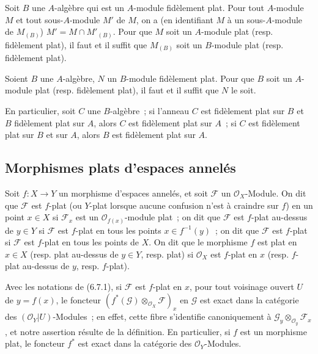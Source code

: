 \begin{env}[6.6.3]
\label{0.6.6.3-fr}
Soit $B$ une $A$-algèbre qui est un $A$-module fidèlement plat. Pour tout
$A$-module $M$ et tout sous-$A$-module $M'$ de $M$, on a (en identifiant $M$
à un sous-$A$-module de $M_{(B)}$) $M'=M\cap M'_{(B)}$. Pour que $M$ soit un
$A$-module plat (resp. fidèlement plat), il faut et il suffit que $M_{(B)}$
soit un $B$-module plat (resp. fidèlement plat).
\end{env}

\begin{env}[6.6.4]
\label{0.6.6.4-fr}
Soient $B$ une $A$-algèbre, $N$ un $B$-module fidèlement plat. Pour que $B$
soit un $A$-module plat (resp. fidèlement plat), il faut et il suffit que $N$
le soit.

En particulier, soit $C$ une $B$-algèbre~; si l'anneau $C$ est fidèlement
plat sur $B$ et $B$ fidèlement plat sur $A$, alors $C$ est fidèlement plat
sur $A$~; si $C$ est fidèlement plat sur $B$ et sur $A$, alors $B$ est
fidèlement plat sur $A$.
\end{env}

\subsection{Morphismes plats d'espaces annelés}
\label{subsection:0.6.7-fr}

\begin{env}[6.7.1]
\label{0.6.7.1-fr}
Soit $f:X\to Y$ un morphisme d'espaces annelés, et soit $\mathcal F$ un
$\mathcal O_X$-Module. On dit que $\mathcal F$ est $f$-plat (ou $Y$-plat
lorsque aucune confusion n'est à craindre sur $f$) en un point $x\in X$ si
$\mathcal F_x$ est un $\mathcal O_{f(x)}$-module plat~; on dit que
$\mathcal F$ est $f$-plat au-dessus de $y\in Y$ si $\mathcal F$ est $f$-plat
en tous les points $x\in f^{-1}(y)$~; on dit que $\mathcal F$ est $f$-plat
si $\mathcal F$ est $f$-plat en tous les points de $X$. On dit que le
morphisme $f$ est plat en $x\in X$ (resp. plat au-dessus de $y\in Y$, resp.
plat) si $\mathcal O_X$ est $f$-plat en $x$ (resp. $f$-plat au-dessus de $y$,
resp. $f$-plat).
\end{env}

\begin{env}[6.7.2]
\label{0.6.7.2-fr}
Avec les notations de (6.7.1), si $\mathcal F$ est $f$-plat en $x$, pour tout
voisinage ouvert $U$ de $y=f(x)$, le foncteur
$(f^*(\mathcal G)\otimes_{\mathcal O_X}\mathcal F)_x$ en $\mathcal G$ est
exact dans la catégorie des $(\mathcal O_Y|U)$-Modules~; en effet, cette
fibre s'identifie canoniquement à
$\mathcal G_y\otimes_{\mathcal O_y}\mathcal F_x$, et notre assertion résulte
de la définition. En particulier, si $f$ est un morphisme plat, le foncteur
$f^*$ est exact dans la catégorie des $\mathcal O_Y$-Modules.
\end{env}

